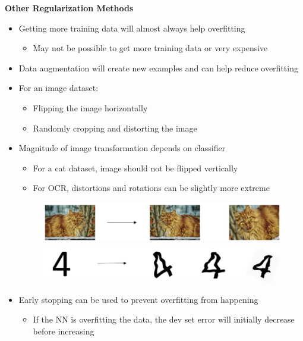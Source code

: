 \documentclass[12pt, letterpaper]{article}
\begin{document}
    \vspace{5mm}
    \textbf{Other Regularization Methods}
    \begin{itemize}
        \item Getting more training data will almost always help overfitting
        \begin{itemize}
            \item May not be possible to get more training data or very expensive
        \end{itemize}
        \item Data augmentation will create new examples and can help reduce overfitting
        \item For an image dataset:
        \begin{itemize}
            \item Flipping the image horizontally
            \item Randomly cropping and distorting the image
        \end{itemize}
        \item Magnitude of image transformation depends on classifier
        \begin{itemize}
            \item For a cat dataset, image should not be flipped vertically 
            \item For OCR, distortions and rotations can be slightly more extreme
        \end{itemize}
        \vspace{5mm}
        \begin{figure}[ht]
            \centering
            \includegraphics[width=12cm]{14.png}
            \includegraphics[width=12cm]{15.png}
        \end{figure}
        \item Early stopping can be used to prevent overfitting from happening
        \begin{itemize}
            \item If the NN is overfitting the data, the dev set error will initially decrease before increasing

\end{itemize}
\end{itemize}
\end{document}
